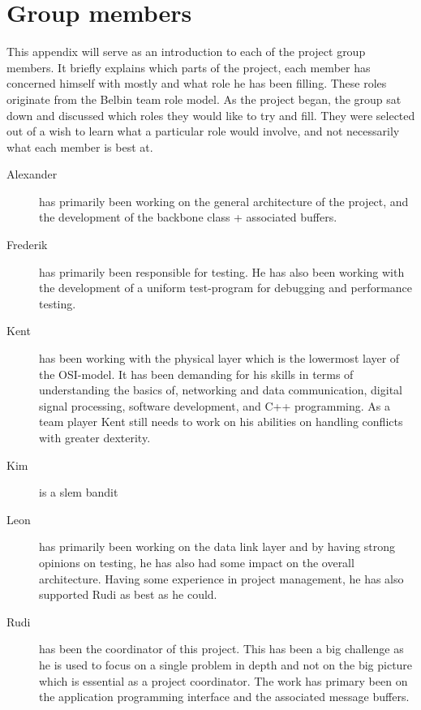 \chapter{Group members}\label{app:members}
This appendix will serve as an introduction to each of the project group
members. It briefly explains which parts of the project, each member has
concerned himself with mostly and what role he has been filling. These roles
originate from the Belbin team role model. As the project began, the group sat
down and discussed which roles they would like to try and fill. They were
selected out of a wish to learn what a particular role would involve, and not
necessarily what each member is best at.

\begin{description}
\item[Alexander] has primarily been working on the general architecture of the
project, and the development of the backbone class + associated buffers.
\item[Frederik] has primarily been responsible for testing. He has also been
working with the development of a uniform test-program for debugging and
performance testing.
\item[Kent] has been working with the physical layer which is the lowermost
layer of the OSI-model. It has been demanding for his skills in terms of understanding the basics of, networking and data communication, digital signal processing, software development, and C++ programming. As a team player Kent still needs to work on his abilities on handling conflicts with greater dexterity.
\item[Kim] is a slem bandit
\item[Leon] has primarily been working on the data link layer and by having
strong opinions on testing, he has also had some impact on the
overall architecture. Having some experience in project management, he has also
supported Rudi as best as he could.
\item[Rudi] has been the coordinator of this project. This has been a big
challenge as he is used to focus on a single problem in depth and not on the
big picture which is essential as a project coordinator. The work has primary been on the application programming interface and the associated message buffers.
\end{description}